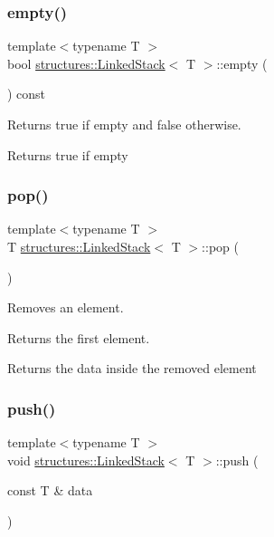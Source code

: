 \subsubsection{\texorpdfstring{empty()}{empty()}}
{\footnotesize\ttfamily template$<$typename T $>$ \\
bool \mbox{\hyperlink{classstructures_1_1_linked_stack}{structures\+::\+Linked\+Stack}}$<$ T $>$\+::empty (\begin{DoxyParamCaption}{ }\end{DoxyParamCaption}) const}



Returns true if empty and false otherwise. 

\begin{DoxyReturn}{Returns}
true if empty 
\end{DoxyReturn}
\mbox{\label{classstructures_1_1_linked_stack_a8ff0ba0de594ec26971bb259e1d28c3c}} 
\subsubsection{\texorpdfstring{pop()}{pop()}}
{\footnotesize\ttfamily template$<$typename T $>$ \\
T \mbox{\hyperlink{classstructures_1_1_linked_stack}{structures\+::\+Linked\+Stack}}$<$ T $>$\+::pop (\begin{DoxyParamCaption}{ }\end{DoxyParamCaption})}



Removes an element. 

Returns the first element.

\begin{DoxyReturn}{Returns}
the data inside the removed element 
\end{DoxyReturn}
\mbox{\label{classstructures_1_1_linked_stack_adb8c6b231298ac25b17ba692d510a3fc}} 
\subsubsection{\texorpdfstring{push()}{push()}}
{\footnotesize\ttfamily template$<$typename T $>$ \\
void \mbox{\hyperlink{classstructures_1_1_linked_stack}{structures\+::\+Linked\+Stack}}$<$ T $>$\+::push (\begin{DoxyParamCaption}\item[{const T \&}]{data }\end{DoxyParamCaption})}



